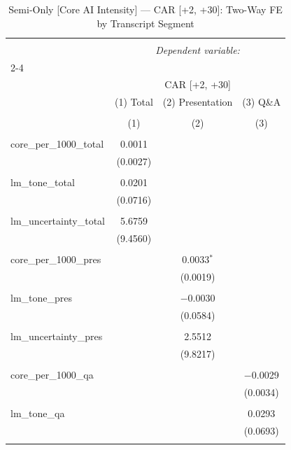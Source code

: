 
\begin{table}[!htbp] \centering 
  \caption{Semi-Only [Core AI Intensity] — CAR [+2, +30]: Two-Way FE by Transcript Segment} 
  \label{} 
\begin{tabular}{@{\extracolsep{5pt}}lccc} 
\\[-1.8ex]\hline 
\hline \\[-1.8ex] 
 & \multicolumn{3}{c}{\textit{Dependent variable:}} \\ 
\cline{2-4} 
\\[-1.8ex] & \multicolumn{3}{c}{CAR [+2, +30]} \\ 
 & (1) Total & (2) Presentation & (3) Q\&A \\ 
\\[-1.8ex] & (1) & (2) & (3)\\ 
\hline \\[-1.8ex] 
 core\_per\_1000\_total & 0.0011 &  &  \\ 
  & (0.0027) &  &  \\ 
  & & & \\ 
 lm\_tone\_total & 0.0201 &  &  \\ 
  & (0.0716) &  &  \\ 
  & & & \\ 
 lm\_uncertainty\_total & 5.6759 &  &  \\ 
  & (9.4560) &  &  \\ 
  & & & \\ 
 core\_per\_1000\_pres &  & 0.0033$^{*}$ &  \\ 
  &  & (0.0019) &  \\ 
  & & & \\ 
 lm\_tone\_pres &  & $-$0.0030 &  \\ 
  &  & (0.0584) &  \\ 
  & & & \\ 
 lm\_uncertainty\_pres &  & 2.5512 &  \\ 
  &  & (9.8217) &  \\ 
  & & & \\ 
 core\_per\_1000\_qa &  &  & $-$0.0029 \\ 
  &  &  & (0.0034) \\ 
  & & & \\ 
 lm\_tone\_qa &  &  & 0.0293 \\ 
  &  &  & (0.0693) \\ 
  & & & \\ 

\end{tabular}
\end{table}
